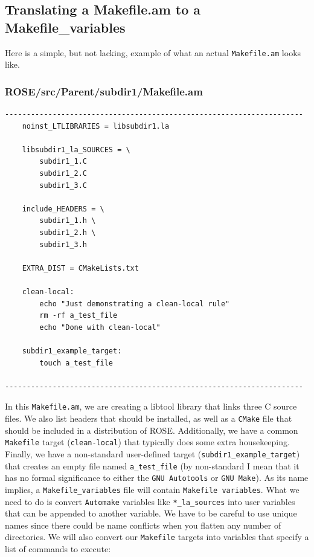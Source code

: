 %

    \subsection{Translating a Makefile.am to a Makefile\_variables}

%
Here is a simple, but not lacking, example of what an actual \texttt{Makefile.am} looks like.
\subsubsection{ROSE/src/Parent/subdir1/Makefile.am}
    \begin{verbatim}
---------------------------------------------------------------------
    noinst_LTLIBRARIES = libsubdir1.la

    libsubdir1_la_SOURCES = \
        subdir1_1.C
        subdir1_2.C
        subdir1_3.C 

    include_HEADERS = \
        subdir1_1.h \
        subdir1_2.h \
        subdir1_3.h

    EXTRA_DIST = CMakeLists.txt

    clean-local:
        echo "Just demonstrating a clean-local rule"
        rm -rf a_test_file
        echo "Done with clean-local"

    subdir1_example_target:
        touch a_test_file

---------------------------------------------------------------------
    \end{verbatim}
In this \texttt{Makefile.am}, we are creating a libtool library that links three C source files. We
also list headers that should be installed, as well as a \texttt{CMake} file that should be
included in a distribution of ROSE. Additionally, we have a common \texttt{Makefile} target
(\texttt{clean-local}) that typically does some extra housekeeping. Finally, we have a non-standard
user-defined target (\texttt{subdir1\_example\_target}) that creates an empty file named
\texttt{a\_test\_file} (by non-standard I mean that it has no formal significance to either the
\texttt{GNU Autotools} or \texttt{GNU Make}).
\newline\newline
As its name implies, a \texttt{Makefile\_variables} file will contain \texttt{Makefile variables}.
What we need to do is convert \texttt{Automake} variables like \texttt{*\_la\_sources} into user
variables that can be appended to another variable. We have to be careful to use unique names
since there could be name conflicts when you flatten any number of directories. We will also
convert our \texttt{Makefile} targets into variables that specify a list of commands to execute:


